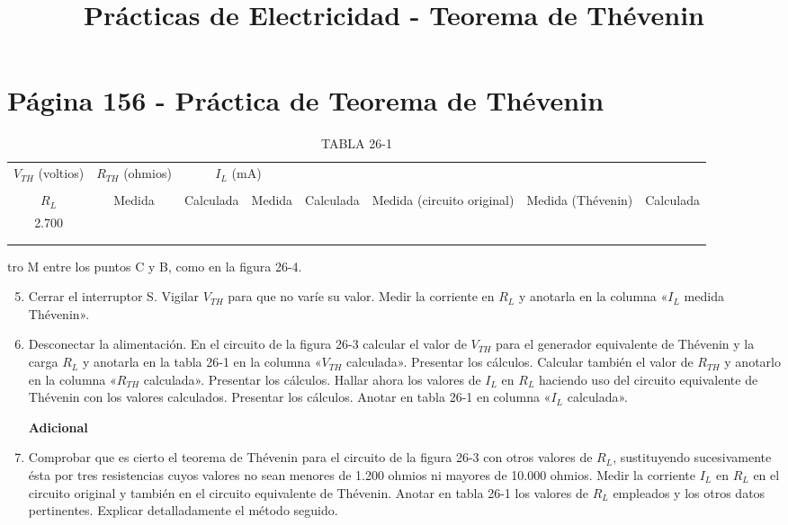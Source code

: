 \documentclass{article}
\title{Prácticas de Electricidad - Teorema de Thévenin}
\author{}
\date{}
\begin{document}
\maketitle

\section*{Página 156 - Práctica de Teorema de Thévenin}

\begin{table}[h]
\centering
\caption{TABLA 26-1}
\label{tab:26-1}
\begin{tabular}{|c|c|c|c|c|c|c|c|}
\hline
$V_{TH}$ (voltios) & $R_{TH}$ (ohmios) & \multicolumn{2}{c|}{$I_L$ (mA)} \\
\cline{3-4}
& & \multicolumn{2}{c|}{} \\
\hline
$R_L$ & Medida & Calculada & Medida & Calculada & Medida (circuito original) & Medida (Thévenin) & Calculada \\
\hline
2.700 & & & & & & & \\
\hline
& & & & & & & \\
\hline
& & & & & & & \\
\hline
\end{tabular}
\end{table}

tro M entre los puntos C y B, como en la figura 26-4.

\begin{enumerate}
\setcounter{enumi}{4}
\item Cerrar el interruptor S. Vigilar $V_{TH}$ para que no varíe su valor. Medir la corriente en $R_L$ y anotarla en la columna «$I_L$ medida Thévenin».

\item Desconectar la alimentación. En el circuito de la figura 26-3 calcular el valor de $V_{TH}$ para el generador equivalente de Thévenin y la carga $R_L$ y anotarla en la tabla 26-1 en la columna «$V_{TH}$ calculada». Presentar los cálculos. Calcular también el valor de $R_{TH}$ y anotarlo en la columna «$R_{TH}$ calculada». Presentar los cálculos. Hallar ahora los valores de $I_L$ en $R_L$ haciendo uso del circuito equivalente de Thévenin con los valores calculados. Presentar los cálculos. Anotar en tabla 26-1 en columna «$I_L$ calculada».

\textbf{Adicional}
\item Comprobar que es cierto el teorema de Thévenin para el circuito de la figura 26-3 con otros valores de $R_L$, sustituyendo sucesivamente ésta por tres resistencias cuyos valores no sean menores de 1.200 ohmios ni mayores de 10.000 ohmios. Medir la corriente $I_L$ en $R_L$ en el circuito original y también en el circuito equivalente de Thévenin. Anotar en tabla 26-1 los valores de $R_L$ empleados y los otros datos pertinentes. Explicar detalladamente el método seguido.
\end{enumerate}
\end{document}
